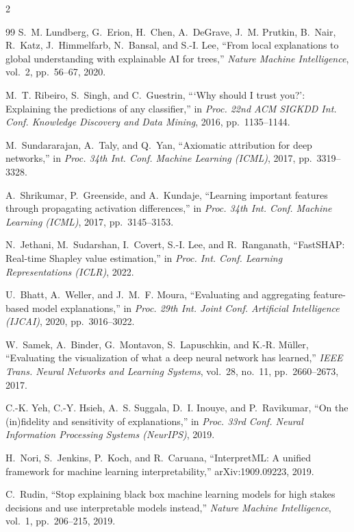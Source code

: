 \begin{multicols}{2}
\begin{thebibliography}{99}
S.~M. Lundberg, G.~Erion, H.~Chen, A.~DeGrave, J.~M. Prutkin, B.~Nair, R.~Katz, J.~Himmelfarb, N.~Bansal, and S.-I. Lee, ``From local explanations to global understanding with explainable AI for trees,'' \textit{Nature Machine Intelligence}, vol.~2, pp.~56--67, 2020.

M.~T. Ribeiro, S.~Singh, and C.~Guestrin, ```Why should I trust you?': Explaining the predictions of any classifier,'' in \textit{Proc. 22nd ACM SIGKDD Int. Conf. Knowledge Discovery and Data Mining}, 2016, pp.~1135--1144.

M.~Sundararajan, A.~Taly, and Q.~Yan, ``Axiomatic attribution for deep networks,'' in \textit{Proc. 34th Int. Conf. Machine Learning (ICML)}, 2017, pp.~3319--3328.

A.~Shrikumar, P.~Greenside, and A.~Kundaje, ``Learning important features through propagating activation differences,'' in \textit{Proc. 34th Int. Conf. Machine Learning (ICML)}, 2017, pp.~3145--3153.

N.~Jethani, M.~Sudarshan, I.~Covert, S.-I. Lee, and R.~Ranganath, ``FastSHAP: Real-time Shapley value estimation,'' in \textit{Proc. Int. Conf. Learning Representations (ICLR)}, 2022.

U.~Bhatt, A.~Weller, and J.~M.~F. Moura, ``Evaluating and aggregating feature-based model explanations,'' in \textit{Proc. 29th Int. Joint Conf. Artificial Intelligence (IJCAI)}, 2020, pp.~3016--3022.

W.~Samek, A.~Binder, G.~Montavon, S.~Lapuschkin, and K.-R. M\"{u}ller, ``Evaluating the visualization of what a deep neural network has learned,'' \textit{IEEE Trans. Neural Networks and Learning Systems}, vol.~28, no.~11, pp.~2660--2673, 2017.

C.-K. Yeh, C.-Y. Hsieh, A.~S. Suggala, D.~I. Inouye, and P.~Ravikumar, ``On the (in)fidelity and sensitivity of explanations,'' in \textit{Proc. 33rd Conf. Neural Information Processing Systems (NeurIPS)}, 2019.

H.~Nori, S.~Jenkins, P.~Koch, and R.~Caruana, ``InterpretML: A unified framework for machine learning interpretability,'' arXiv:1909.09223, 2019.

C.~Rudin, ``Stop explaining black box machine learning models for high stakes decisions and use interpretable models instead,'' \textit{Nature Machine Intelligence}, vol.~1, pp.~206--215, 2019.


\end{thebibliography}
\end{multicols}
